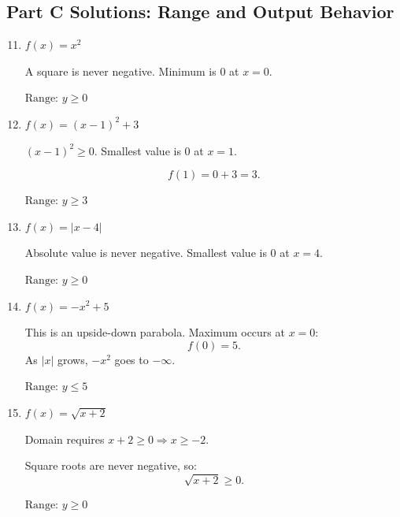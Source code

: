 \documentclass[14pt]{extarticle}
\begin{document}
\subsection*{Part C Solutions: Range and Output Behavior}
\begin{enumerate}
  \setcounter{enumi}{10}
  \item \(f(x) = x^2\)

  A square is never negative. Minimum is 0 at \(x = 0.\)

  \(\boxed{\text{Range: } y \ge 0}\)

  \item \(f(x) = (x - 1)^2 + 3\)

  \((x - 1)^2 \ge 0\). Smallest value is 0 at \(x = 1.\)

  \[
  f(1) = 0 + 3 = 3.
  \]

  \(\boxed{\text{Range: } y \ge 3}\)

  \item \(f(x) = |x - 4|\)

  Absolute value is never negative. Smallest value is 0 at \(x = 4.\)

  \(\boxed{\text{Range: } y \ge 0}\)

  \item \(f(x) = -x^2 + 5\)

  This is an upside-down parabola. Maximum occurs at \(x = 0\):
  \[
  f(0) = 5.
  \]
  As \(|x|\) grows, \(-x^2\) goes to \(-\infty.\)

  \(\boxed{\text{Range: } y \le 5}\)

  \item \(f(x) = \sqrt{x + 2}\)

  Domain requires \(x + 2 \ge 0 \Rightarrow x \ge -2.\)

  Square roots are never negative, so:
  \[
  \sqrt{x + 2} \ge 0.
  \]

  \(\boxed{\text{Range: } y \ge 0}\)
\end{enumerate}
\end{document}
